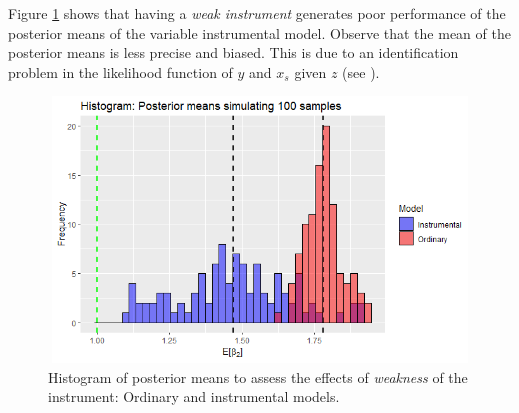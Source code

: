 \begin{enumerate}[leftmargin=*]
Figure \ref{fig71} shows that having a \textit{weak instrument} generates poor performance of the posterior means of the variable instrumental model. Observe that the mean of the posterior means is less precise and biased. This is due to an identification problem in the likelihood function of $y$ and $x_s$ given $z$ (see \cite[Chap.~7]{Rossi2005}).

\begin{figure}
	\includegraphics[width=340pt, height=200pt]{Chapters/chapter7/figures/Fig71.png}
	\caption[List of figure caption goes here]{Histogram of posterior means to assess the effects of \textit{weakness} of the instrument: Ordinary and instrumental models.}\label{fig71}
\end{figure}



\end{enumerate}
